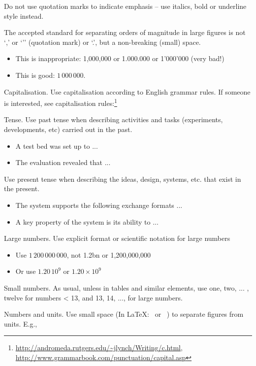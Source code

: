Do not use quotation marks to indicate emphasis – use italics, bold or underline style instead.

The accepted standard for separating orders of magnitude in large figures is not ‘,’ or ‘’’ (quotation mark) or ‘.’, but a non-breaking (small) space.

\begin{itemize}
    \item This is inappropriate: 1,000,000 or 1.000.000 or 1’000’000 (very bad!)
    \item This is good: $1\,000\,000$.
\end{itemize}

Capitalisation. Use capitalisation according to English grammar rules. If someone is interested, see
capitalisation rules:\footnote{\url{http://andromeda.rutgers.edu/~jlynch/Writing/c.html}, \url{http://www.grammarbook.com/punctuation/capital.asp}}

Tense. Use past tense when describing activities and tasks (experiments, developments, etc) carried out in the past.

\begin{itemize}
    \item A test bed was set up to ...
    \item The evaluation revealed that ...
\end{itemize}

Use present tense when describing the ideas, design, systems, etc. that exist in the present.

\begin{itemize}
    \item The system supports the following exchange formats ...
    \item A key property of the system is its ability to ...
\end{itemize}

Large numbers. Use explicit format or scientific notation for large numbers

\begin{itemize}
    \item Use $1\,200\,000\,000$, not 1.2bn or 1,200,000,000
    \item Or use $1.20\,10^9$ or $1.20 \times 10^9$
\end{itemize}

Small numbers. As usual, unless in tables and similar elements, use {one, two, ... , twelve} for numbers < 13, and {13, 14, ..., } for large numbers.

Numbers and units. Use small space (In \LaTeX: \, or ~) to separate figures from units. E.g.,

